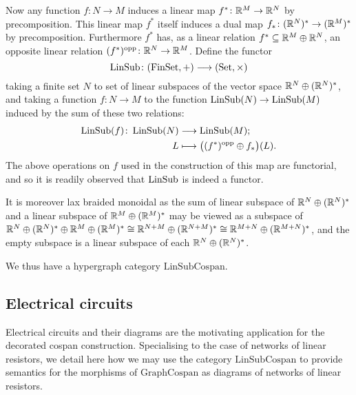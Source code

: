 Now any function $f\colon N \to M$ induces a linear map $f^\ast\colon  {\mathbb{R}}^M \to
{\mathbb{R}}^N$ by precomposition. This linear map $f^\ast$ itself induces a dual map
$f_\ast\colon ({\mathbb{R}}^N)^\ast \to ({\mathbb{R}}^M)^\ast$ by precomposition. Furthermore
$f^\ast$ has, as a linear relation $f^\ast \subseteq {\mathbb{R}}^M \oplus {\mathbb{R}}^N$, an
opposite linear relation $(f^\ast)^{\mathrm{opp}}\colon  {\mathbb{R}}^N \to {\mathbb{R}}^M$.  Define the
functor 
\[
  \operatorname{LinSub}\colon  (\mathrm{FinSet},+) \longrightarrow (\mathrm{Set},\times)
\]
taking a finite set $N$ to set of linear subspaces of the vector space ${\mathbb{R}}^N
\oplus ({\mathbb{R}}^N)^\ast$, and taking a function $f\colon  N \to M$ to the function
$\operatorname{LinSub}(N) \to \operatorname{LinSub}(M)$ induced by the sum of these two relations:
\begin{align*}
  \operatorname{LinSub}(f)\colon  \operatorname{LinSub}(N) &\longrightarrow \operatorname{LinSub}(M); \\
  L &\longmapsto \big((f^\ast)^{\mathrm{opp}} \oplus f_\ast\big)(L).
\end{align*}
The above operations on $f$ used in the construction of this map are functorial,
and so it is readily observed that $\operatorname{LinSub}$ is indeed a functor.

It is moreover lax braided monoidal as the sum of linear subspace of ${\mathbb{R}}^N
\oplus ({\mathbb{R}}^N)^\ast$ and a linear subspace of ${\mathbb{R}}^M \oplus ({\mathbb{R}}^M)^\ast$ may be
viewed as a subspace of ${\mathbb{R}}^N \oplus ({\mathbb{R}}^N)^\ast \oplus {\mathbb{R}}^M \oplus ({\mathbb{R}}^M)^\ast
\cong {\mathbb{R}}^{N+M} \oplus ({\mathbb{R}}^{N+M})^\ast \cong {\mathbb{R}}^{M+N} \oplus ({\mathbb{R}}^{M+N})^\ast$,
and the empty subspace is a linear subspace of each ${\mathbb{R}}^N \oplus ({\mathbb{R}}^N)^\ast$.

We thus have a hypergraph category $\mathrm{LinSubCospan}$.

\subsection{Electrical circuits} 
Electrical circuits and their diagrams are the motivating application for the
decorated cospan construction. Specialising to the case of networks of linear
resistors, we detail here how we may use the category $\mathrm{LinSubCospan}$ to
provide semantics for the morphisms of $\mathrm{GraphCospan}$ as diagrams of
networks of linear resistors.

